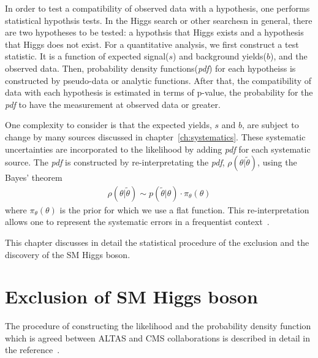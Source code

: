 In order to test a compatibility of observed data with a hypothesis, 
one performs statistical hypothsis tests. In the Higgs search or 
other searchesn in general, there are two hypotheses to be tested: 
a hypothsis that Higgs exists and a hypothesis that Higgs does not exist. 
For a quantitative analysis, we first construct a test statistic. 
It is a function of expected signal($s$) and background yields($b$),
and the observed data. Then, probability density functions(\textit{pdf}) for 
each hypotheiss is constructed by pseudo-data or analytic functions. 
After that, the compatibility of data with each hypothesis is estimated
in terms of p-value, the probability for the \textit{pdf} to have the measurement 
at observed data or greater. 

One complexity to consider is that the 
expected yields, $s$ and $b$, are subject to change by many sources 
discussed in chapter~\ref{ch:systematics}. These systematic uncertainties 
are incorporated to the likelihood by adding \textit{pdf} for each systematic source. 
The \textit{pdf} is constructed by re-interpretating the \textit{pdf}, 
$\rho(\theta | \tilde{\theta})$, using the Bayes' theorem 
\begin{eqnarray} 
\rho(\theta | \tilde{\theta}) 
\sim 
p(\tilde{\theta} | \theta) \cdot \pi_\theta \left( \theta \right)  
\end{eqnarray} 
where $\pi_\theta \left( \theta \right)$ is the prior for which 
we use a flat function. This re-interpretation allows one to 
represent the systematic errors in a frequentist context~\cite{combination_stat}. 

This chapter discusses in detail the statistical procedure of the exclusion 
and the discovery of the SM Higgs boson.  

\section{Exclusion of SM Higgs boson}
\label{sec:stat_exclusion}

The procedure of constructing the likelihood and the probability density function 
which is agreed between ALTAS and CMS collaborations is
described in detail in the reference~\cite{combination_stat}.

